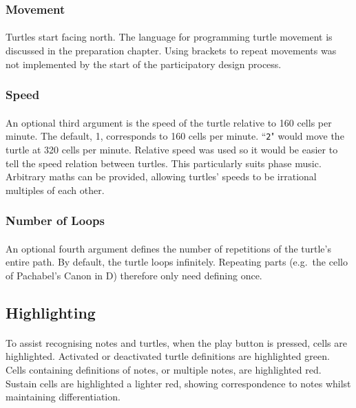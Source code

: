 \subsubsection{Movement}

\paragraph{} Turtles start facing north. The language for programming turtle movement is discussed in the preparation chapter. Using brackets to repeat movements was not implemented by the start of the participatory design process.

\subsubsection{Speed}

\paragraph{} An optional third argument is the speed of the turtle relative to 160 cells per minute. The default, 1, corresponds to 160 cells per minute. ``\texttt{2}" would move the turtle at 320 cells per minute. Relative speed was used so it would be easier to tell the speed relation between turtles. This particularly suits phase music. Arbitrary maths can be provided, allowing turtles' speeds to be irrational multiples of each other.

\subsubsection{Number of Loops}

\paragraph{} An optional fourth argument defines the number of repetitions of the turtle's entire path. By default, the turtle loops infinitely. Repeating parts (e.g.~the cello  of Pachabel's Canon in D) therefore only need defining once.

\subsection{Highlighting}

\paragraph{} To assist recognising notes and turtles, when the play button is pressed, cells are highlighted. Activated or deactivated turtle definitions are highlighted green. Cells containing definitions of notes, or multiple notes, are highlighted red. Sustain cells are highlighted a lighter red, showing correspondence to notes whilst maintaining differentiation.

